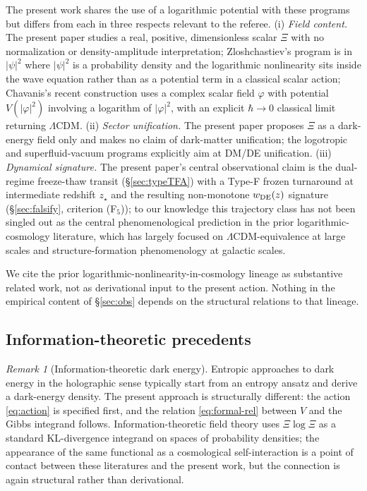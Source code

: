 \documentclass[11pt,reqno]{amsart}
\theoremstyle{plain}
\theoremstyle{definition}
\theoremstyle{remark}
\newtheorem*{remark}{Remark}
\begin{document}
The present work shares the use of a logarithmic potential with these
programs but differs from each in three respects relevant to the
referee. (i) \emph{Field content.} The present paper studies a real,
positive, dimensionless scalar $\Xi$ with no normalization or
density-amplitude interpretation; Zloshchastiev's program is in
$|\psi|^{2}$ where $|\psi|^{2}$ is a probability density and the
logarithmic nonlinearity sits inside the wave equation rather than as
a potential term in a classical scalar action; Chavanis's recent
\cite{Chavanis2022Logotropic} construction uses a complex scalar field
$\varphi$ with potential $V(|\varphi|^{2})$ involving a logarithm of
$|\varphi|^{2}$, with an explicit $\hbar \to 0$ classical limit
returning $\Lambda$CDM. (ii) \emph{Sector unification.} The present
paper proposes $\Xi$ as a dark-energy field only and makes no claim of
dark-matter unification; the logotropic and superfluid-vacuum programs
explicitly aim at DM/DE unification. (iii) \emph{Dynamical signature.}
The present paper's central observational claim is the dual-regime
freeze-thaw transit (\S\ref{sec:typeTFA}) with a Type-F frozen
turnaround at intermediate redshift $z_\star$ and the resulting
non-monotone $w_{\rm DE}(z)$ signature
(\S\ref{sec:falsify}, criterion (F$_5$)); to our knowledge this
trajectory class has not been singled out as the central
phenomenological prediction in the prior logarithmic-cosmology
literature, which has largely focused on $\Lambda$CDM-equivalence at
large scales and structure-formation phenomenology at galactic scales.

We cite the prior logarithmic-nonlinearity-in-cosmology lineage as
substantive related work, not as derivational input to the present
action. Nothing in the empirical content of \S\ref{sec:obs} depends
on the structural relations to that lineage.

\subsection{Information-theoretic precedents}

\begin{remark}[Information-theoretic dark energy]
Entropic approaches to dark energy in the holographic sense
\cite{Verlinde2011,CHLZ2012} typically start from an entropy ansatz
and derive a dark-energy density. The present approach is structurally
different: the action \eqref{eq:action} is specified first, and the
relation \eqref{eq:formal-rel} between $V$ and the Gibbs integrand
follows. Information-theoretic field theory \cite{Ensslin2013,Caticha2012}
uses $\Xi\log\Xi$ as a standard KL-divergence integrand on spaces of
probability densities; the appearance of the same functional as a
cosmological self-interaction is a point of contact between these
literatures and the present work, but the connection is again
structural rather than derivational.
\end{remark}
\end{document}
